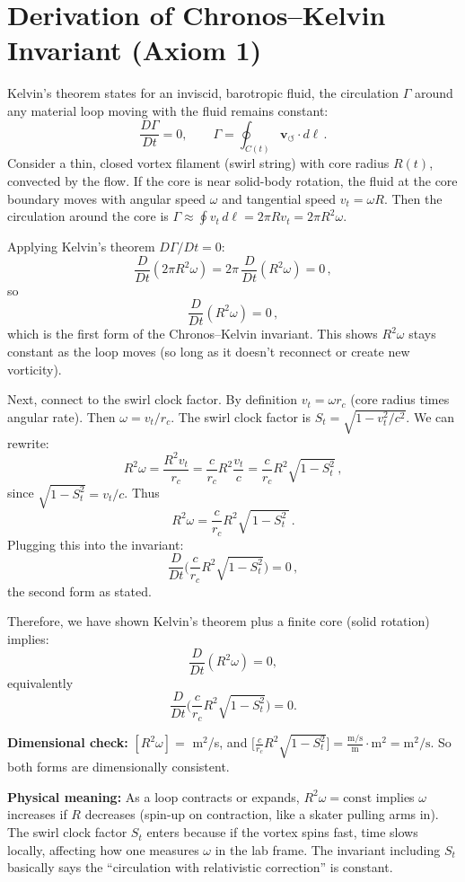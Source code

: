 \documentclass[10pt,reprint,aps,onecolumn,nofootinbib]{revtex4-2}
\newcommand{\vswirl}{\mathbf{v}_{\!\boldsymbol{\circlearrowleft}}}
\begin{document}
    \section{Derivation of Chronos–Kelvin Invariant (Axiom 1)}
    Kelvin’s theorem states for an inviscid, barotropic fluid, the circulation $\Gamma$ around any material loop moving with the fluid remains constant:
    \[
        \frac{D\Gamma}{Dt} = 0, \qquad \Gamma = \oint_{C(t)} \vswirl \cdot d\ell\,.
    \]
    Consider a thin, closed vortex filament (swirl string) with core radius $R(t)$, convected by the flow. If the core is near solid-body rotation, the fluid at the core boundary moves with angular speed $\omega$ and tangential speed $v_t = \omega R$. Then the circulation around the core is $\Gamma \approx \oint v_t\,d\ell = 2\pi R v_t = 2\pi R^2 \omega$.

    Applying Kelvin’s theorem $D\Gamma/Dt=0$:
    \[
        \frac{D}{Dt}(2\pi R^2 \omega) = 2\pi\,\frac{D}{Dt}(R^2 \omega) = 0\,,
    \]
    so
    \[
        \frac{D}{Dt}(R^2 \omega) = 0\,,
    \]
    which is the first form of the Chronos–Kelvin invariant. This shows $R^2 \omega$ stays constant as the loop moves (so long as it doesn’t reconnect or create new vorticity).

    Next, connect to the swirl clock factor. By definition $v_t = \omega r_c$ (core radius times angular rate). Then $\omega = v_t/r_c$. The swirl clock factor is $S_t = \sqrt{1 - v_t^2/c^2}$. We can rewrite:
    \[
        R^2 \omega = \frac{R^2 v_t}{r_c} = \frac{c}{r_c} R^2 \frac{v_t}{c} = \frac{c}{r_c} R^2 \sqrt{1 - S_t^2}\,,
    \]
    since $\sqrt{1 - S_t^2} = v_t/c$. Thus
    \[
        R^2 \omega = \frac{c}{r_c} R^2 \sqrt{\,1 - S_t^2\,}\,.
    \]
    Plugging this into the invariant:
    \[
        \frac{D}{Dt}\Big(\frac{c}{r_c} R^2 \sqrt{1 - S_t^2}\Big) = 0\,,
    \]
    the second form as stated.

    Therefore, we have shown Kelvin’s theorem plus a finite core (solid rotation) implies:
    \[
        \frac{D}{Dt}(R^2 \omega) = 0,
    \]
    equivalently
    \[
        \frac{D}{Dt}\Big(\frac{c}{r_c}R^2\sqrt{1 - S_t^2}\Big) = 0.
    \]

    \noindent\textbf{Dimensional check:} $[R^2 \omega] =$ m$^2$/s, and
    $\big[\frac{c}{r_c}R^2\sqrt{1 - S_t^2}\big] = \frac{\text{m/s}}{\text{m}} \cdot \text{m}^2 = \text{m}^2/\text{s}$. So both forms are dimensionally consistent.

    \noindent\textbf{Physical meaning:} As a loop contracts or expands, $R^2 \omega = \text{const}$ implies $\omega$ increases if $R$ decreases (spin-up on contraction, like a skater pulling arms in). The swirl clock factor $S_t$ enters because if the vortex spins fast, time slows locally, affecting how one measures $\omega$ in the lab frame. The invariant including $S_t$ basically says the “circulation with relativistic correction” is constant.
\end{document}
